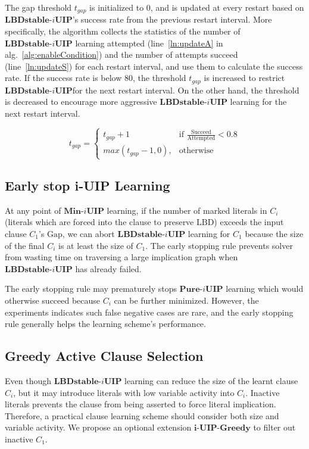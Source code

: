 \documentclass[runningheads]{llncs}
\newcommand{\oneUIPClause}{\ensuremath{C_{1}}}
\newcommand{\iUIPClause}{\ensuremath{C_{i}}}
\newcommand{\LBD}{\text{LBD}}
\newcommand{\GAP}{\text{Gap}}
\newcommand{\IUIP}{\textbf{LBDstable-$i$UIP}}
\newcommand{\IUIPPURE}{\textbf{Pure-$i$UIP}}
\newcommand{\IUIPMIN}{\textbf{Min-$i$UIP}}
\newcommand{\IUIPGreedy}{\textbf{i-UIP-Greedy}}
\begin{document}
The gap threshold $t_{gap}$ is initialized to 0, and is updated at
every restart based on $\IUIP$'s success rate from the previous
restart interval. More specifically, the algorithm collects the
statistics of the number of $\IUIP$ learning attempted
(line~\ref{ln:updateA} in alg.~\ref{alg:enableCondition}) and the
number of attempts succeed (line~\ref{ln:updateS}) for each restart
interval, and use them to calculate the success rate. If the success
rate is below 80, the threshold $t_{gap}$ is increased to restrict
$\IUIP$for the next restart interval. On the other hand, the threshold
is decreased to encourage more aggressive $\IUIP$ learning for the
next restart interval.

\[
    t_{gap}=
\begin{cases}
    t_{gap} + 1& \text{if } \frac{\text{Succeed}}{\text{Attempted}} < 0.8\\
    max(t_{gap} - 1, 0),              & \text{otherwise}
\end{cases}
\]

\subsection{Early stop i-UIP Learning}
At any point of $\IUIPMIN$ learning, if the number of marked literals
in $\iUIPClause$ (literals which are forced into the clause to
preserve $\LBD$) exceeds the input clause $\oneUIPClause$'s $\GAP$, we
can abort $\IUIP$ learning for $\oneUIPClause$ because the size of the
final $\iUIPClause$ is at least the size of $\oneUIPClause$.  The
early stopping rule prevents solver from wasting time on traversing a
large implication graph when $\IUIP$ has already failed.

The early stopping rule may prematurely stops $\IUIPPURE$ learning
which would otherwise succeed because $\iUIPClause$ can be further
minimized. However, the experiments indicates such false negative
cases are rare, and the early stopping rule generally helps the
learning scheme's performance.

\subsection{Greedy Active Clause Selection} \label{sec:greedy} Even
though $\IUIP$ learning can reduce the size of the learnt clause
$\iUIPClause$, but it may introduce literals with low variable
activity into $\iUIPClause$.  Inactive literals prevents the clause
from being asserted to force literal implication. Therefore, a
practical clause learning scheme should consider both size and
variable activity. We propose an optional extension $\IUIPGreedy$ to
filter out inactive $\oneUIPClause$.
\end{document}
